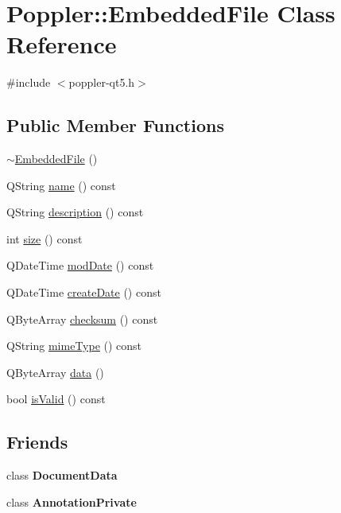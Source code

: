 \hypertarget{class_poppler_1_1_embedded_file}{}\section{Poppler\+:\+:Embedded\+File Class Reference}
\label{class_poppler_1_1_embedded_file}


{\ttfamily \#include $<$poppler-\/qt5.\+h$>$}

\subsection*{Public Member Functions}
\begin{DoxyCompactItemize}
\item 
\hyperlink{class_poppler_1_1_embedded_file_a693ebe5a8adf7ac0209e850d21a17040}{$\sim$\+Embedded\+File} ()
\item 
Q\+String \hyperlink{class_poppler_1_1_embedded_file_a9b1d6050fc8aed39d4b9fb3d6a16c3e4}{name} () const
\item 
Q\+String \hyperlink{class_poppler_1_1_embedded_file_a51afb8f38e7a53d4baf4d7573e46eec6}{description} () const
\item 
int \hyperlink{class_poppler_1_1_embedded_file_acf6adc1e33a5efbe4430893576c9b59b}{size} () const
\item 
Q\+Date\+Time \hyperlink{class_poppler_1_1_embedded_file_aaf1bdd117d8f36a6ca83a2630bb1938f}{mod\+Date} () const
\item 
Q\+Date\+Time \hyperlink{class_poppler_1_1_embedded_file_aa82a829cfb9148f8596146021691d494}{create\+Date} () const
\item 
Q\+Byte\+Array \hyperlink{class_poppler_1_1_embedded_file_a9a370ff9c3d1946f040b4fd78a89274e}{checksum} () const
\item 
Q\+String \hyperlink{class_poppler_1_1_embedded_file_a9e52a79a453da96dbccb47cdbd401c6f}{mime\+Type} () const
\item 
Q\+Byte\+Array \hyperlink{class_poppler_1_1_embedded_file_ae72838cedd19245a261f27004d3c2c01}{data} ()
\item 
bool \hyperlink{class_poppler_1_1_embedded_file_a1b35b34decb76a1553109dd66bc368ee}{is\+Valid} () const
\end{DoxyCompactItemize}
\subsection*{Friends}
\begin{DoxyCompactItemize}
\item 
\mbox{\label{class_poppler_1_1_embedded_file_a5f30d346de2175fe7a14e3faac37e209}} 
class {\bfseries Document\+Data}
\item 
\mbox{\label{class_poppler_1_1_embedded_file_add0bc3e32e560f9e9eb3025587c1ad54}} 
class {\bfseries Annotation\+Private}
\end{DoxyCompactItemize}



